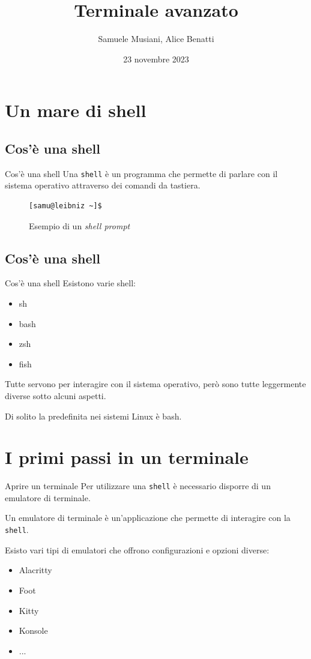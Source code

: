 \documentclass{beamer}
\title{Terminale avanzato}
\author{Samuele Musiani, Alice Benatti}
\institute{Università di Bologna, corso di Laurea in Informatica}
\date{23 novembre 2023}
\begin{document}
\begin{frame} 
  \titlepage
\end{frame}

\section{Un mare di shell}

\subsection{Cos'è una shell}
\begin{frame}[fragile]{Cos'è una shell}
  Una \texttt{shell} è un programma che permette di parlare con il sistema 
  operativo attraverso dei comandi da tastiera.
  \pause

  \begin{figure}
        \begin{lstlisting}
[samu@leibniz ~]$
    \end{lstlisting}
    \caption{Esempio di un \textit{shell prompt}}
  \end{figure}
\end{frame}

\subsection{Cos'è una shell}
\begin{frame}[fragile]{Cos'è una shell}
  Esistono varie shell:
  \begin{itemize}
    \item sh
    \item bash
    \item zsh
    \item fish
  \end{itemize}
  Tutte servono per interagire con il sistema operativo, però sono tutte 
  leggermente diverse sotto alcuni aspetti.\medskip

  Di solito la predefinita nei sistemi Linux è bash.
\end{frame}

\section{I primi passi in un terminale}
\begin{frame}{Aprire un terminale}
  Per utilizzare una \texttt{shell} è necessario disporre di un emulatore di 
  terminale.\bigskip

  Un emulatore di terminale è un'applicazione che permette di interagire con
  la \texttt{shell}.\medskip

  Esisto vari tipi di emulatori che offrono configurazioni e opzioni diverse:
  \begin{itemize}
    \item Alacritty
    \item Foot
    \item Kitty
    \item Konsole
    \item ...
  \end{itemize}
\end{frame}
\end{document}
